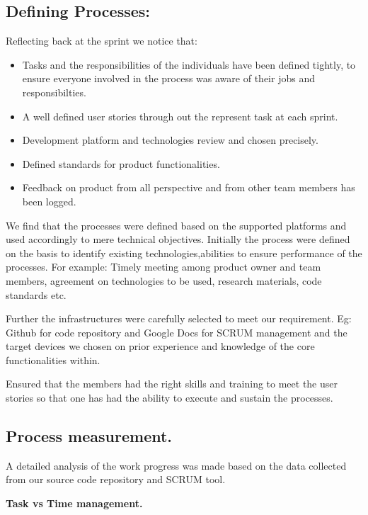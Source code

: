 \subsection{Defining Processes:}

Reflecting back at the sprint we notice that:

\begin{itemize}
	\item Tasks and the responsibilities of the individuals have been defined tightly, to ensure everyone involved in the process was aware  of their jobs and responsibilties.
	\item A well defined user stories through out the represent task at each sprint.
	\item Development platform and technologies review and chosen precisely.
	\item Defined standards for product functionalities.
	\item Feedback on product from all perspective and from other team members has been logged.
\end{itemize}

We find that the processes were defined based on the supported platforms and used accordingly to mere technical objectives. Initially the process were defined on the basis to identify existing technologies,abilities to ensure performance of the processes. For example: Timely meeting among product owner and team members, agreement on technologies to be used, research materials, code standards etc.

Further the infrastructures were carefully selected to meet our requirement.
Eg: Github for code repository and Google Docs for SCRUM management and the target devices we chosen on prior experience and knowledge of the core functionalities within.

Ensured that the members had the right skills and training to meet the user stories so that one has had the ability to execute and sustain the processes.

\subsection{Process measurement.}

A detailed analysis of the work progress was made based on the data collected from our source code repository and SCRUM tool.

\textbf{Task vs Time management.}

